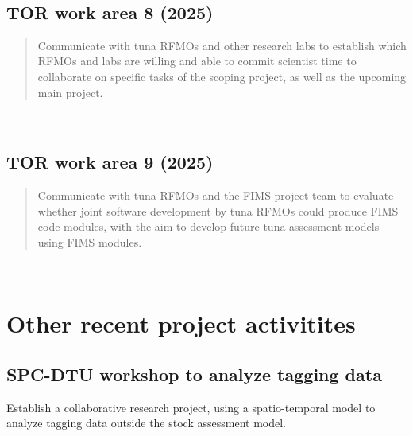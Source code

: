 \documentclass{SCreport}
\begin{document}
\vspace{2ex}

~

\vspace{2ex}

\subsection{TOR work area 8 (2025)}

\begin{quote}\sf
  Communicate with tuna RFMOs and other research labs to establish which RFMOs
  and labs are willing and able to commit scientist time to collaborate on
  specific tasks of the scoping project, as well as the upcoming main project.
\end{quote}

\vspace{2ex}

~

\vspace{2ex}

\subsection{TOR work area 9 (2025)}

\begin{quote}\sf
  Communicate with tuna RFMOs and the FIMS project team to evaluate whether
  joint software development by tuna RFMOs could produce FIMS code modules, with
  the aim to develop future tuna assessment models using FIMS modules.
\end{quote}

\vspace{2ex}

~

\vspace{2ex}

\section{Other recent project activitites}

\subsection{SPC-DTU workshop to analyze tagging data}
\label{sec:dtu-workshop}

Establish a collaborative research project, using a spatio-temporal model to
analyze tagging data outside the stock assessment model.
\end{document}
